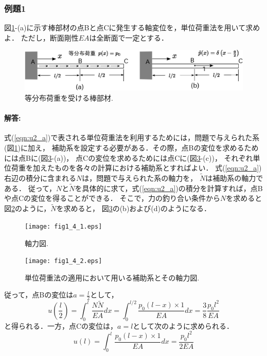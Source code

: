 \documentclass[10pt,a4j]{jarticle}
\begin{document}
\subsubsection{例題1}
図\ref{fig:fig1_4}-(a)に示す棒部材の点Bと点Cに発生する軸変位を，単位荷重法を用いて求めよ．
ただし，断面剛性$EA$は全断面で一定とする．
\begin{figure}[h]
	\begin{center}
	\includegraphics[width=0.4\linewidth]{fig1_4.eps} 
	\end{center}
	\caption{等分布荷重を受ける棒部材.}
	\label{fig:fig1_4}
\end{figure}
\paragraph{解答:}
式(\ref{eqn:u2_a})で表される単位荷重法を利用するためには，問題で与えられた系(図\ref{fig:fig1_4})に加え，
補助系を設定する必要がある．その際，点Bの変位を求めるためには点Bに(図\ref{fig:fig1_4_2}-(a))，
点Cの変位を求めるためには点Cに(図\ref{fig:fig1_4_2}-(c))，
それぞれ単位荷重を加えたものを各々の計算における補助系とすればよい．
式(\ref{eqn:u2_a})右辺の積分に含まれる$N$は，問題で与えられた系の軸力を，
$\tilde N$は補助系の軸力である．
従って，$N$と$\tilde N$を具体的に求て，式(\ref{eqn:u2_a})の積分を計算すれば，点Bや点Cの変位を得ることができる．
そこで，力の釣り合い条件から$N$を求めると図\ref{fig:fig1_4_1}のように，$\tilde N$を求めると，
図\ref{fig:fig1_4_2}の(b)および(d)のようになる．
\begin{figure}[h]
	\begin{center}
	\texttt{[image: fig1\_4\_1.eps]} 
	\end{center}
	\caption{軸力図.} 
	\label{fig:fig1_4_1}
\end{figure}
\begin{figure}[h]
	\begin{center}
	\texttt{[image: fig1\_4\_2.eps]} 
	\end{center}
	\caption{単位荷重法の適用において用いる補助系とその軸力図.} 
	\label{fig:fig1_4_2}
\end{figure}
従って，点Bの変位は$a=\frac{l}{2}$として，
\begin{equation}
	u\left(\frac{l}{2} \right)
	=
	\int _0^l \frac{N\tilde N}{EA}dx
	=
	\int _0^{l/2} \frac{p_0(l-x)\times 1}{EA}dx=\frac{3}{8}\frac{p_0l^2}{EA}
	\label{eqn:}
\end{equation}
と得られる．一方，点Cの変位は，$a=l$として次のように求められる．
\begin{equation}
	u(l)=\int_0^l\frac{p_0(l-x)\times 1}{EA}dx=\frac{p_0l^2}{2EA}
	\label{eqn:}
\end{equation}
\end{document}
